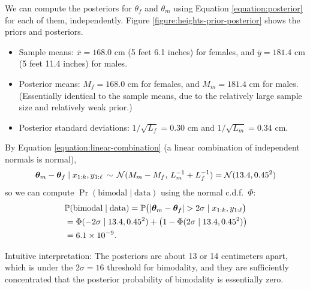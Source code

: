 \documentclass[12pt]{article}
\begin{document}
We can compute the posteriors for $\theta_f$ and $\theta_m$ using Equation \ref{equation:posterior} for each of them, independently.  Figure \ref{figure:heights-prior-posterior} shows the priors and posteriors. 
\begin{itemize}
\item Sample means: $\bar x = 168.0$ cm (5 feet 6.1 inches) for females, and $\bar y = 181.4$ cm (5 feet 11.4 inches) for males.
\item Posterior means: $M_f = 168.0$ cm for females, and $M_m = 181.4$ cm for males. (Essentially identical to the sample means, due to the relatively large sample size and relatively weak prior.)
\item Posterior standard deviations: $1/\sqrt{L_f} = 0.30$ cm and $1/\sqrt{L_m} = 0.34$ cm.
\end{itemize}
By Equation \ref{equation:linear-combination} (a linear combination of independent normals is normal),
$${\bm\theta}_m-{\bm\theta}_f\mid x_{1:k},y_{1:\ell}\,\sim\,\mathcal{N}(M_m-M_f,\, L_m^{-1} + L_f^{-1}) = \mathcal{N}(13.4,0.45^2) $$
so we can compute $\Pr(\text{bimodal}\mid \text{data})$ using the normal c.d.f.\ $\Phi$:
\begin{align*}
&\Pr(\text{bimodal}\mid \text{data})= \Pr\big(|\btheta_m-\btheta_f|>2\sigma \mid x_{1:k},y_{1:\ell}\big) \\
&= \Phi(-2\sigma\mid 13.4,0.45^2)
+ \big(1-\Phi(2\sigma\mid 13.4,0.45^2)\big)\\
& = 6.1\times 10^{-9}.
\end{align*}

Intuitive interpretation: The posteriors are about 13 or 14 centimeters apart, which is under the $2\sigma = 16$ threshold for bimodality, and they are sufficiently concentrated that the posterior probability of bimodality is essentially zero.


\end{document}
